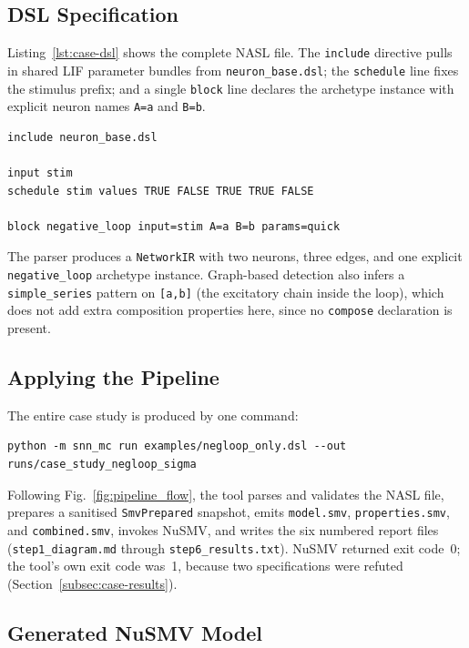 \documentclass[
]{ceurart}
\begin{document}
\subsection{DSL Specification}

Listing~\ref{lst:case-dsl} shows the complete \textsc{NASL} file. The
\texttt{include} directive pulls in shared LIF parameter bundles from
\texttt{neuron\_base.dsl}; the \texttt{schedule} line fixes the stimulus
prefix; and a single \texttt{block} line declares the archetype instance
with explicit neuron names \texttt{A=a} and \texttt{B=b}.

\begin{lstlisting}[style=pythoncode,caption={Case-study \textsc{NASL} file (\texttt{examples/negloop\_only.dsl}).},label=lst:case-dsl]
include neuron_base.dsl

input stim
schedule stim values TRUE FALSE TRUE TRUE FALSE

block negative_loop input=stim A=a B=b params=quick
\end{lstlisting}

The parser produces a \texttt{NetworkIR} with two neurons, three edges,
and one explicit \texttt{negative\_loop} archetype instance. Graph-based
detection also infers a \texttt{simple\_series} pattern on \texttt{[a,b]}
(the excitatory chain inside the loop), which does not add extra
composition properties here, since no \texttt{compose} declaration is
present.

\subsection{Applying the Pipeline}

The entire case study is produced by one command:
\begin{verbatim}
python -m snn_mc run examples/negloop_only.dsl --out runs/case_study_negloop_sigma
\end{verbatim}
Following Fig.~\ref{fig:pipeline_flow}, the tool parses and validates the
\textsc{NASL} file, prepares a sanitised \texttt{SmvPrepared} snapshot,
emits \texttt{model.smv}, \texttt{properties.smv}, and
\texttt{combined.smv}, invokes NuSMV, and writes the six numbered report
files (\texttt{step1\_diagram.md} through \texttt{step6\_results.txt}).
NuSMV returned exit code~0; the tool's own exit code was~1, because two
specifications were refuted (Section~\ref{subsec:case-results}).

\subsection{Generated NuSMV Model}
\end{document}
